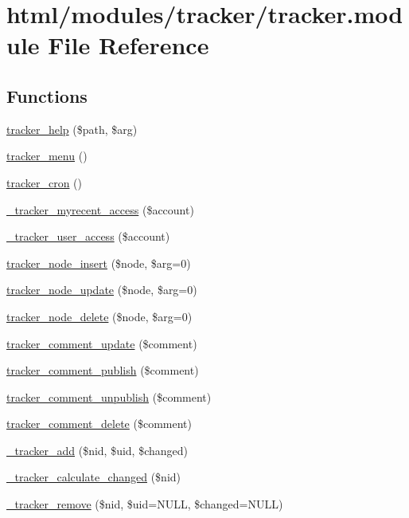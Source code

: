 \hypertarget{tracker_8module}{
\section{html/modules/tracker/tracker.module File Reference}
\label{tracker_8module}
}
\subsection*{Functions}
\begin{DoxyCompactItemize}
\item 
\hyperlink{tracker_8module_a34ce08561a0ee7c41d382a89c9ad351d}{tracker\_\-help} (\$path, \$arg)
\item 
\hyperlink{tracker_8module_a9f1821155039eab4ea1f8e4893113c75}{tracker\_\-menu} ()
\item 
\hyperlink{tracker_8module_a8c6e69f3f4bb29bcae1b0b858393839c}{tracker\_\-cron} ()
\item 
\hyperlink{tracker_8module_ac4856efc2417df78e8bf35c9703a057f}{\_\-tracker\_\-myrecent\_\-access} (\$account)
\item 
\hyperlink{tracker_8module_aaf6435001007410f28f708aba215179a}{\_\-tracker\_\-user\_\-access} (\$account)
\item 
\hyperlink{tracker_8module_ac8a528a31cb636901922ff27ae512a73}{tracker\_\-node\_\-insert} (\$node, \$arg=0)
\item 
\hyperlink{tracker_8module_a3b4c27688afa88c4f96739274091e997}{tracker\_\-node\_\-update} (\$node, \$arg=0)
\item 
\hyperlink{tracker_8module_a2b027e86cbf4a3b871485ba3166f54c0}{tracker\_\-node\_\-delete} (\$node, \$arg=0)
\item 
\hyperlink{tracker_8module_ae2eb7d292f5bc837380129a38cbe10ff}{tracker\_\-comment\_\-update} (\$comment)
\item 
\hyperlink{tracker_8module_aa2b8956283fed818e733b2e1ebaf79a9}{tracker\_\-comment\_\-publish} (\$comment)
\item 
\hyperlink{tracker_8module_affcdc2f73a4cc6a602507927d739fd94}{tracker\_\-comment\_\-unpublish} (\$comment)
\item 
\hyperlink{tracker_8module_abe592f3f5d21a4930f7f56177043efbb}{tracker\_\-comment\_\-delete} (\$comment)
\item 
\hyperlink{tracker_8module_a742289477e9eedbcebe46fd6742241b1}{\_\-tracker\_\-add} (\$nid, \$uid, \$changed)
\item 
\hyperlink{tracker_8module_a9595bd37607687d5271ca52aaa91eed7}{\_\-tracker\_\-calculate\_\-changed} (\$nid)
\item 
\hyperlink{tracker_8module_a414225e6ad54c9fa8ca5578c83599a6f}{\_\-tracker\_\-remove} (\$nid, \$uid=NULL, \$changed=NULL)
\end{DoxyCompactItemize}


